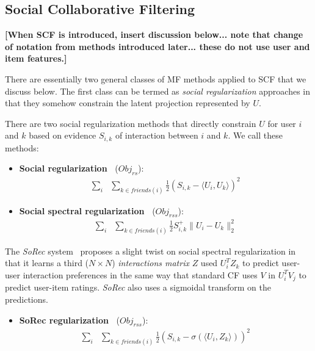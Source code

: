 \documentclass{sig-alternate}
\newcommand{\Obj}{\mathit{Obj}}
\newcommand{\rs}{\mathit{rs}}
\newcommand{\rss}{\mathit{rss}}
\newcommand{\la}{\langle}
\newcommand{\ra}{\rangle}
\begin{document}
\label{sec:Background}

\subsection{Social Collaborative Filtering}

{\bf [When SCF is introduced, insert discussion below... note that change
of notation from methods introduced later... these do not use user and item
features.]}


There are essentially two general classes of MF methods applied to SCF that we discuss
below.  The first class can be termed as \emph{social regularization}
approaches in that they somehow constrain the latent projection
represented by $U$.  

There are two social regularization methods that directly constrain $U$ for user $i$
and $k$ based on evidence $S_{i,k}$ of interaction between $i$ and $k$.  We call
these methods:

\begin{itemize}
\item {\bf Social regularization~\cite{lla,socinf}} ($\Obj_\rs$):
\begin{align}
\sum_{i} & \sum_{k \in \mathit{friends}(i)} \frac{1}{2} (S_{i,k} - \la U_i, U_k \ra)^2 \nonumber 
\end{align}

\item {\bf Social spectral regularization~\cite{sr,rrmf}} ($\Obj_\rss$):
\begin{align}
\sum_{i} & \sum_{k \in \mathit{friends}(i)} \frac{1}{2} S^+_{i,k} \| U_i - U_k \|_2^2 \nonumber
\end{align}
\end{itemize}

The {\it SoRec} system~\cite{sorec} proposes a slight twist on social
spectral regularization in that it learns a third ($N \times N$)
\emph{interactions matrix} $Z$ used $U_i^T Z_k$ to predict user-user
interaction preferences in the same way that standard CF uses $V$ in
$U_i^T V_j$ to predict user-item ratings.  {\it SoRec} also uses a
sigmoidal transform on the predictions.

\begin{itemize}
\item {\bf SoRec regularization~\cite{sorec}} ($\Obj_\rss$):
\begin{align}
\sum_{i} & \sum_{k \in \mathit{friends}(i)} \frac{1}{2} (S_{i,k} - \sigma(\la U_i, Z_k \ra))^2 \nonumber
\end{align}
\end{itemize}
\end{document}
